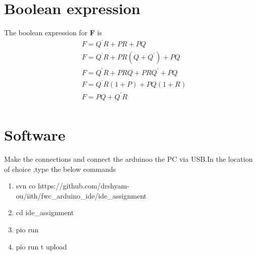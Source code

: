 \documentclass[journal,10pt,twocolumn]{article}
\begin{document}
\section*{\large Boolean expression}
The boolean expression for \textbf{F} is
\begin{align*}%
&F=Q^{\prime}R+PR+PQ\\
&F=Q^{\prime}R+PR(Q+Q^{\prime})+PQ\\
&F=Q^{\prime}R+PRQ+PRQ^{\prime}+PQ\\
&F=Q^{\prime}R(1+P)+PQ(1+R)\\
&F=PQ+Q^{\prime}R\\
\end{align*}

\section*{\large Software}
Make the connections and connect the arduinoo the PC via USB.In the location of choice ,type the below commands
\begin{enumerate}
\item svn co https://github.com/drshyam-ou/iith/fwc\_arduino\_ide/ide\_assignment
\item cd ide\_assignment
\item pio run
\item pio run \-t upload
\end{enumerate}
\end{document}
